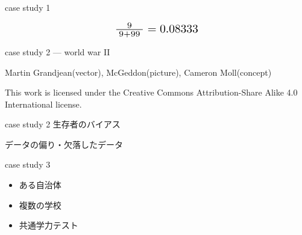 \documentclass[
  ignorenonframetext,
  aspectratio=169]{beamer}
\begin{document}
\begin{frame}{case study 1}
\protect\hypertarget{case-study-1-5}{}
\begin{center}\Huge               
\[
 \scalebox{1.4}{$\frac{9}{\;9 + 99\;}=0.08333$}
\]
\end{center}
\end{frame}

\begin{frame}{}
\protect\hypertarget{section-2}{}
\Huge

\scalebox{1.4}{\textcolor{softblue}{事例2}}
\end{frame}

\begin{frame}{case study 2 --- world war II}
\protect\hypertarget{case-study-2-world-war-ii}{}
\raggedleft


\tiny

\raggedleft

Martin Grandjean(vector), McGeddon(picture), Cameron Moll(concept)

\vspace{-5pt}

This work is licensed under the Creative Commons Attribution-Share Alike
4.0 International license.

\pause

\Huge
\vspace{-120pt}

\vspace{-130pt}
\end{frame}

\begin{frame}{case study 2 生存者のバイアス}
\protect\hypertarget{case-study-2-ux751fux5b58ux8005ux306eux30d0ux30a4ux30a2ux30b9}{}
\LARGE

データの偏り・欠落したデータ
\end{frame}

\begin{frame}{}
\protect\hypertarget{section-3}{}
\Huge

\scalebox{1.4}{\textcolor{softblue}{事例3}}
\end{frame}

\begin{frame}{case study 3}
\protect\hypertarget{case-study-3}{}
\Huge

\begin{itemize}
\item[\textbullet] ある自治体
\item[\textbullet] 複数の学校
\item[\textbullet] 共通学力テスト
\end{itemize}
\end{frame}
\end{document}
